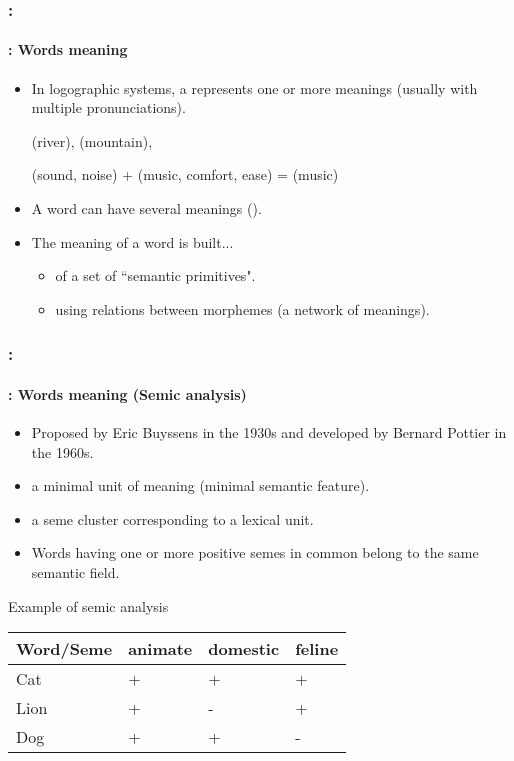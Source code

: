 \documentclass[xcolor=table]{beamer}
\begin{document}
\begin{frame}
	\frametitle{\insertshortsubtitle: \insertsection}
	\framesubtitle{\insertsubsection: Words meaning}

	\begin{itemize}
		\item In logographic systems, a  represents one or more meanings (usually with multiple pronunciations).
		
		\begin{CJK}{UTF8}{min}
			 (river),  (mountain), 
			
			 (sound, noise) +  (music, comfort, ease) =  (music)
		\end{CJK}
	
		\item A word can have several meanings ().
		\item The meaning of a word is built...
		\begin{itemize}
			\item of a set of ``semantic primitives".
			\item using relations between morphemes (a network of meanings).
		\end{itemize}
	\end{itemize}

\end{frame}


\begin{frame}
	\frametitle{\insertshortsubtitle: \insertsection}
	\framesubtitle{\insertsubsection: Words meaning (Semic analysis)}

	\begin{itemize}
		\item Proposed by Eric Buyssens in the 1930s and developed by Bernard Pottier in the 1960s.
		\item {} a minimal unit of meaning (minimal semantic feature).
		\item {} a seme cluster corresponding to a lexical unit.
		\item Words having one or more positive semes in common belong to the same semantic field.
	\end{itemize}
	
	\begin{exampleblock}{Example of semic analysis}
		\centering
		\begin{tabular}{|l|l|l|l|}
			\hline
			Word/Seme & animate & domestic & feline \\
			\hline
			Cat & + & + & + \\
			\hline
			Lion & + & - & + \\
			\hline
			Dog & + & + & - \\
			\hline
		\end{tabular}
	\end{exampleblock}

\end{frame}
\end{document}
